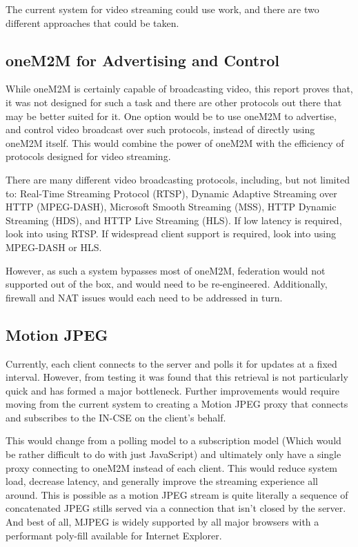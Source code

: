 The current system for video streaming could use work, and there are two different approaches that could be taken.

\subsection{oneM2M for Advertising and Control}

While oneM2M is certainly capable of broadcasting video, this report proves that, it was not designed for such a task and there are other protocols out there that may be better suited for it. One option would be to use oneM2M to advertise, and control video broadcast over such protocols, instead of directly using oneM2M itself. This would combine the power of oneM2M with the efficiency of protocols designed for video streaming.

There are many different video broadcasting protocols, including, but not limited to: Real-Time Streaming Protocol (RTSP), Dynamic Adaptive Streaming over HTTP (MPEG-DASH), Microsoft Smooth Streaming (MSS), HTTP Dynamic Streaming (HDS), and HTTP Live Streaming (HLS). If low latency is required, look into using RTSP. If widespread client support is required, look into using MPEG-DASH or HLS.

However, as such a system bypasses most of oneM2M, federation would not supported out of the box, and would need to be re-engineered. Additionally, firewall and NAT issues would each need to be addressed in turn.

\subsection{Motion JPEG}

Currently, each client connects to the server and polls it for updates at a fixed interval. However, from testing it was found that this retrieval is not particularly quick and has formed a major bottleneck. Further improvements would require moving from the current system to creating a Motion JPEG proxy that connects and subscribes to the IN-CSE on the client’s behalf. 

This would change from a polling model to a subscription model (Which would be rather difficult to do with just JavaScript) and ultimately only have a single proxy connecting to oneM2M instead of each client. This would reduce system load, decrease latency, and generally improve the streaming experience all around. This is possible as a motion JPEG stream is quite literally a sequence of concatenated JPEG stills served via a connection that isn't closed by the server. And best of all, MJPEG is widely supported by all major browsers with a performant poly-fill available for Internet Explorer. 


